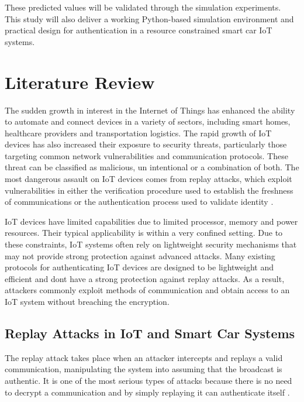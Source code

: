 \documentclass[a4paper,man,12pt]{article}
\begin{document}
These predicted values will be validated through the simulation experiments. This study will also deliver a working Python-based simulation environment and practical design for authentication in a resource constrained smart car IoT systems.

\pagebreak


\section{Literature Review}

The sudden growth in interest in the Internet of Things has enhanced the ability to automate and connect devices in a variety of sectors, including smart homes, healthcare providers and transportation logistics. The rapid growth of IoT devices has also increased their exposure to security threats, particularly those targeting common network vulnerabilities and communication protocols. These threat can be classified as malicious, un intentional or a combination of both. The most dangerous assault on IoT devices comes from replay attacks, which exploit vulnerabilities in either the verification procedure used to establish the freshness of communications or the authentication process used to validate identity \parencite{002}.\bigbreak 

IoT devices have limited capabilities due to limited processor, memory and power resources. Their typical applicability is within a very confined setting. Due to these constraints, IoT systems often rely on lightweight security mechanisms that may not provide strong protection against advanced attacks. Many existing protocols for authenticating IoT devices are designed to be lightweight and efficient and dont have a strong protection against replay attacks. As a result, attackers commonly exploit methods of communication and obtain access to an IoT system without breaching the encryption.
  
\subsection{Replay Attacks in IoT and Smart Car Systems}

The replay attack takes place when an attacker intercepts and replays a valid communication, manipulating the system into assuming that the broadcast is authentic. It is one of the most serious types of attacks because there is no need to decrypt a communication and by simply replaying it can authenticate itself \parencite{002}.\bigbreak 
\end{document}
